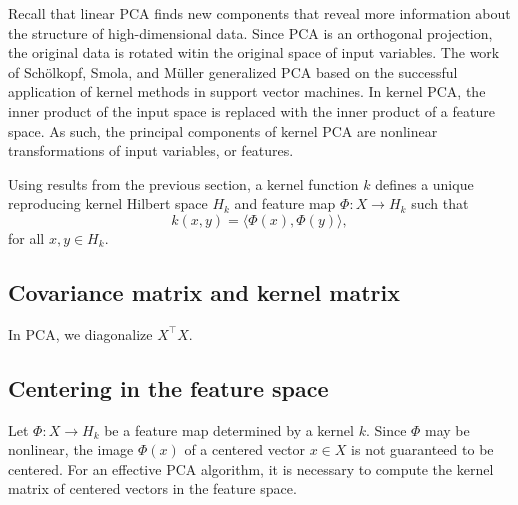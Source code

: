 Recall that linear PCA finds new components that reveal more information about the structure of high-dimensional data.
Since PCA is an orthogonal projection, the original data is rotated witin the original space of input variables.
The work of Sch\"olkopf, Smola, and M\"uller \cite{scholkopf1997kernel,scholkopf1998nonlinear} generalized PCA based on the successful application of kernel methods in support vector machines.
In kernel PCA, the inner product of the input space is replaced with the inner product of a feature space.
As such, the principal components of kernel PCA are nonlinear transformations of input variables, or features.

Using results from the previous section, a kernel function \(k\) defines a unique reproducing kernel Hilbert space \(H_k\) and feature map \(\Phi : X \to H_k\) such that
\begin{equation}
    \label{eqn:kernel-inner-product}
    k(x,y) = \langle \Phi(x), \Phi(y) \rangle,
\end{equation}
for all \(x, y \in H_k\).

\subsection{Covariance matrix and kernel matrix}
In PCA, we diagonalize \(X^\top X\).

\subsection{Centering in the feature space}
\label{sec:centering-in-the-feature-space}
Let \(\Phi : X \to H_k\) be a feature map determined by a kernel \(k\).
Since \(\Phi\) may be nonlinear, the image \(\Phi(x)\) of a centered vector \(x \in X\) is not guaranteed to be centered.
For an effective PCA algorithm, it is necessary to compute the kernel matrix of centered vectors in the feature space. \cite{scholkopf1998nonlinear}

